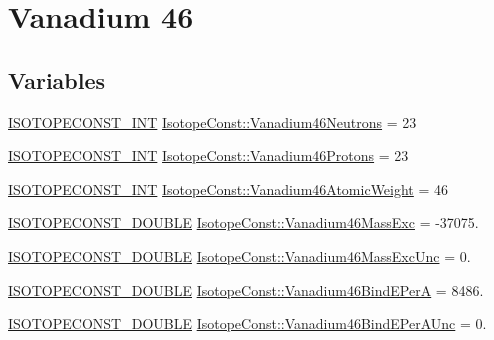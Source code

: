 \hypertarget{group___isotope_const-_vanadium-_v46}{}\section{Vanadium 46}
\label{group___isotope_const-_vanadium-_v46}
\subsection*{Variables}
\begin{DoxyCompactItemize}
\item 
\mbox{\hyperlink{group___isotope_const-_macros_ga5f18360b3e99483a35c32d789e62621c}{I\+S\+O\+T\+O\+P\+E\+C\+O\+N\+S\+T\+\_\+\+I\+NT}} \mbox{\hyperlink{group___isotope_const-_vanadium-_v46_gac577ac08fc86c220c2ee3a224f2f1bf3}{Isotope\+Const\+::\+Vanadium46\+Neutrons}} = 23
\item 
\mbox{\hyperlink{group___isotope_const-_macros_ga5f18360b3e99483a35c32d789e62621c}{I\+S\+O\+T\+O\+P\+E\+C\+O\+N\+S\+T\+\_\+\+I\+NT}} \mbox{\hyperlink{group___isotope_const-_vanadium-_v46_ga07204aeb14a0b9ec0858920279df0d4c}{Isotope\+Const\+::\+Vanadium46\+Protons}} = 23
\item 
\mbox{\hyperlink{group___isotope_const-_macros_ga5f18360b3e99483a35c32d789e62621c}{I\+S\+O\+T\+O\+P\+E\+C\+O\+N\+S\+T\+\_\+\+I\+NT}} \mbox{\hyperlink{group___isotope_const-_vanadium-_v46_ga557e5781370e1dea7969895314f4287a}{Isotope\+Const\+::\+Vanadium46\+Atomic\+Weight}} = 46
\item 
\mbox{\hyperlink{group___isotope_const-_macros_ga8f45a7272ce02c0b4c65c44636ed719a}{I\+S\+O\+T\+O\+P\+E\+C\+O\+N\+S\+T\+\_\+\+D\+O\+U\+B\+LE}} \mbox{\hyperlink{group___isotope_const-_vanadium-_v46_ga7855d2f8d0c08ce22d4b8fd35862d925}{Isotope\+Const\+::\+Vanadium46\+Mass\+Exc}} = -\/37075.
\item 
\mbox{\hyperlink{group___isotope_const-_macros_ga8f45a7272ce02c0b4c65c44636ed719a}{I\+S\+O\+T\+O\+P\+E\+C\+O\+N\+S\+T\+\_\+\+D\+O\+U\+B\+LE}} \mbox{\hyperlink{group___isotope_const-_vanadium-_v46_gac218448ccd22218773d4de202991b1ba}{Isotope\+Const\+::\+Vanadium46\+Mass\+Exc\+Unc}} = 0.
\item 
\mbox{\hyperlink{group___isotope_const-_macros_ga8f45a7272ce02c0b4c65c44636ed719a}{I\+S\+O\+T\+O\+P\+E\+C\+O\+N\+S\+T\+\_\+\+D\+O\+U\+B\+LE}} \mbox{\hyperlink{group___isotope_const-_vanadium-_v46_ga5c0b0186dc794a1544f7b4e53e19d362}{Isotope\+Const\+::\+Vanadium46\+Bind\+E\+PerA}} = 8486.
\item 
\mbox{\hyperlink{group___isotope_const-_macros_ga8f45a7272ce02c0b4c65c44636ed719a}{I\+S\+O\+T\+O\+P\+E\+C\+O\+N\+S\+T\+\_\+\+D\+O\+U\+B\+LE}} \mbox{\hyperlink{group___isotope_const-_vanadium-_v46_ga9f5853b31750dfcb42d77b37bd1cd9ed}{Isotope\+Const\+::\+Vanadium46\+Bind\+E\+Per\+A\+Unc}} = 0.

\end{DoxyCompactItemize}
